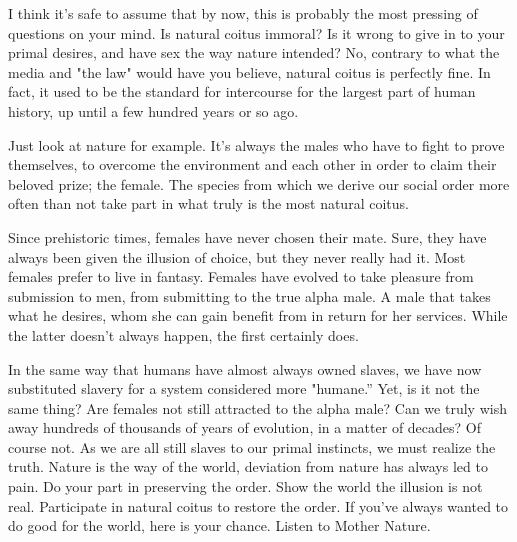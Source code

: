  
I think it's safe to assume that by now, this is probably the most pressing of 
questions on your mind. Is natural coitus immoral? Is it wrong to give in to 
your primal desires, and have sex the way nature intended? No, contrary to what 
the media and "the law" would have you believe, natural coitus is perfectly 
fine. In fact, it used to be the standard for intercourse for the largest part 
of human history, up until a few hundred years or so ago.

Just look at nature for example. It's always the males who have to fight to 
prove themselves, to overcome the environment and each other in order to claim 
their beloved prize; the female. The species from which we derive our social 
order more often than not take part in what truly is the most natural coitus.

Since prehistoric times, females have never chosen their mate. Sure, they have 
always been given the illusion of choice, but they never really had it. Most 
females prefer to live in fantasy. Females have evolved to take pleasure from 
submission to men, from submitting to the true alpha male. A male that takes 
what he desires, whom she can gain benefit from in return for her services. 
While the latter doesn't always happen, the first certainly does.

In the same way that humans have almost always owned slaves, we have now 
substituted slavery for a system considered more "humane.” Yet, is it not the 
same thing? Are females not still attracted to the alpha male? Can we truly wish 
away hundreds of thousands of years of evolution, in a matter of decades? Of 
course not. As we are all still slaves to our primal instincts, we must realize 
the truth. Nature is the way of the world, deviation from nature has always led 
to pain. Do your part in preserving the order. Show the world the illusion is 
not real. Participate in natural coitus to restore the order. If you've always 
wanted to do good for the world, here is your chance. Listen to Mother Nature.

